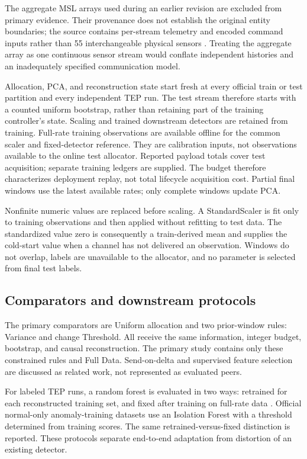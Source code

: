 \documentclass[12pt]{article}
\begin{document}
The aggregate MSL arrays used during an earlier revision are excluded from
primary evidence. Their provenance does not establish the original entity
boundaries; the source contains per-stream telemetry and encoded command inputs
rather than 55 interchangeable physical sensors \cite{telemanomdata}.
Treating the aggregate array as one continuous sensor stream would conflate
independent histories and an inadequately specified communication model.

Allocation, PCA, and reconstruction state start fresh at every official train
or test partition and every independent TEP run. The test stream therefore
starts with a counted uniform bootstrap, rather than retaining part of the
training controller's state. Scaling and trained downstream detectors are
retained from training. Full-rate training observations are available offline
for the common scaler and fixed-detector reference. They are calibration inputs,
not observations available to the online test allocator. Reported payload totals
cover test acquisition; separate training ledgers are supplied. The budget
therefore characterizes deployment replay, not total lifecycle acquisition cost. Partial final windows use the latest available rates;
only complete windows update PCA.

Nonfinite numeric values are replaced before scaling. A StandardScaler is fit
only to training observations and then applied without refitting to test data.
The standardized value zero is consequently a train-derived mean and supplies
the cold-start value when a channel has not delivered an observation. Windows
do not overlap, labels are unavailable to the allocator, and no parameter is
selected from final test labels.

\subsection{Comparators and downstream protocols}

The primary comparators are Uniform allocation and two prior-window rules:
Variance and change Threshold. All receive the same information, integer
budget, bootstrap, and causal reconstruction. The primary study contains only these constrained rules and Full Data.
Send-on-delta and supervised feature selection are discussed as related work,
not represented as evaluated peers.

For labeled TEP runs, a random forest is evaluated in two ways: retrained for
each reconstructed training set, and fixed after training on full-rate data
\cite{breiman2001random}. Official normal-only anomaly-training datasets use an
Isolation Forest with a threshold determined from training scores. The same
retrained-versus-fixed distinction is reported. These protocols separate
end-to-end adaptation from distortion of an existing detector.
\end{document}
